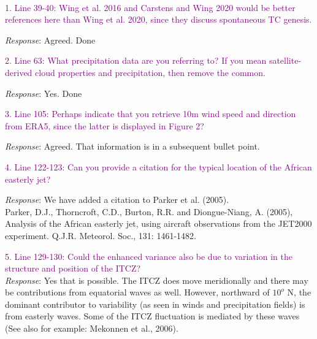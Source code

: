 \documentclass[10pt, letterpaper]{article}
\begin{document}
{{\vspace{.25in}

 \\

\textcolor{purple}{1. Line 39-40: Wing et al. 2016 and Carstens and Wing 2020 would be better references here than Wing et al. 2020, since they discuss spontaneous TC genesis.} \\

{\emph{Response}: Agreed. Done


\vspace{.25in}
\textcolor{purple}{2. Line 63: What precipitation data are you referring to? If you mean satellite-derived cloud properties and precipitation, then remove the common.}\\

{\emph{Response}: Yes. Done


\vspace{.25in}
\textcolor{purple}{3. Line 105: Perhaps indicate that you retrieve 10m wind speed and direction from ERA5, since the latter is displayed in Figure 2?} \\

{\emph{Response}: Agreed. That information is in a subsequent bullet point.

\vspace{.25in}

\textcolor{purple}{4. Line 122-123: Can you provide a citation for the typical location of the African easterly jet?} \\


{\emph{Response}: We have added a citation to Parker et al. (2005).\\

Parker, D.J., Thorncroft, C.D., Burton, R.R. and Diongue-Niang, A. (2005), Analysis of the African 
easterly jet, using aircraft observations from the 
JET2000 experiment. Q.J.R. Meteorol. Soc., 131: 
1461-1482.

\vspace{.25in}

\textcolor{purple}{
5. Line 129-130: Could the enhanced variance also be due to variation in the structure and position of the ITCZ?} \\

{\emph{Response}: Yes that is possible. The ITCZ does move meridionally and there may be contributions from equatorial waves as well. However, northward of $10^o$ N, the dominant contributor to variability (as seen in winds and precipitation fields) is from easterly waves. Some of the ITCZ fluctuation is mediated by these waves (See also for example: Mekonnen et al., 2006).\\

}}}}}}}
\end{document}
